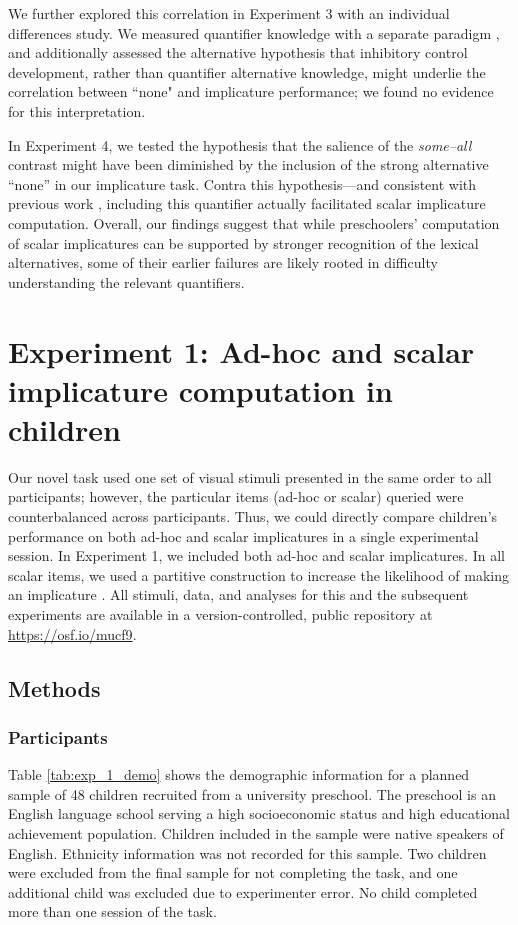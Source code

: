 \documentclass[man]{apa2}
\begin{document}
We further explored this correlation in Experiment 3 with an individual differences study. We measured quantifier knowledge with a separate paradigm \cite{barner2009}, and additionally assessed the alternative hypothesis that inhibitory control development, rather than quantifier alternative knowledge, might underlie the correlation between ``none" and implicature performance; we found no evidence for this interpretation.

In Experiment 4, we tested the hypothesis that the salience of the \emph{some--all} contrast might have been diminished by the inclusion of the strong alternative ``none'' in our implicature task.  Contra this hypothesis---and consistent with previous work \cite{skordos2016}, including this quantifier actually facilitated scalar implicature computation. Overall, our findings suggest that while preschoolers' computation of scalar implicatures can be supported by stronger recognition of the lexical alternatives, some of their earlier failures are likely rooted in difficulty understanding the relevant quantifiers.

\section{Experiment 1: Ad-hoc and scalar implicature computation in children}

Our novel task used one set of visual stimuli presented in the same order to all participants; however, the particular items (ad-hoc or scalar) queried were counterbalanced across participants. Thus, we could directly compare children's performance on both ad-hoc and scalar implicatures in a single experimental session. In Experiment 1, we included both ad-hoc and scalar implicatures. In all scalar items, we used a partitive construction to increase the likelihood of making an implicature \cite{degen2015}. All stimuli, data, and analyses for this and the subsequent experiments are available in a version-controlled, public repository at \url{https://osf.io/mucf9}.

\subsection{Methods}

\subsubsection{Participants}

Table \ref{tab:exp_1_demo} shows the demographic information for a planned sample of 48 children recruited from a university preschool. The preschool is an English language school serving a high socioeconomic status and high educational achievement population. Children included in the sample were native speakers of English. Ethnicity information was not recorded for this sample. Two children were excluded from the final sample for not completing the task, and one additional child was excluded due to experimenter error. No child completed more than one session of the task.
\end{document}
